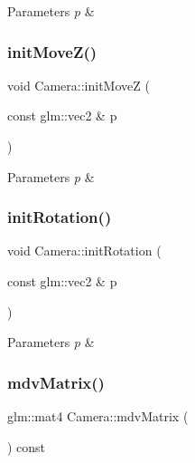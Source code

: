 \begin{DoxyParams}{Parameters}
{\em p} & \\
\hline
\end{DoxyParams}
\mbox{\label{class_camera_a89c903f8ff8b16fccd8544af273ece2d}} 
\subsubsection{\texorpdfstring{init\+Move\+Z()}{initMoveZ()}}
{\footnotesize\ttfamily void Camera\+::init\+MoveZ (\begin{DoxyParamCaption}\item[{const glm\+::vec2 \&}]{p }\end{DoxyParamCaption})\hspace{0.3cm}{\ttfamily [inline]}}


\begin{DoxyParams}{Parameters}
{\em p} & \\
\hline
\end{DoxyParams}
\mbox{\label{class_camera_af24fe5e14b2ba41196b95ad4a2eabb7c}} 
\subsubsection{\texorpdfstring{init\+Rotation()}{initRotation()}}
{\footnotesize\ttfamily void Camera\+::init\+Rotation (\begin{DoxyParamCaption}\item[{const glm\+::vec2 \&}]{p }\end{DoxyParamCaption})\hspace{0.3cm}{\ttfamily [inline]}}


\begin{DoxyParams}{Parameters}
{\em p} & \\
\hline
\end{DoxyParams}
\mbox{\label{class_camera_ac6671aeaa88d6cc673864f0183d5046b}} 
\subsubsection{\texorpdfstring{mdv\+Matrix()}{mdvMatrix()}}
{\footnotesize\ttfamily glm\+::mat4 Camera\+::mdv\+Matrix (\begin{DoxyParamCaption}{ }\end{DoxyParamCaption}) const\hspace{0.3cm}{\ttfamily [inline]}}

